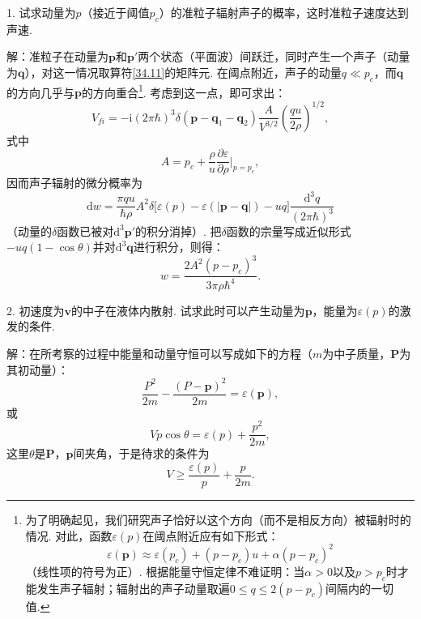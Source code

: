 \begin{xiti}

1. 试求动量为$p$（接近于阈值$p_{c}$）的准粒子辐射声子的概率，这时准粒子速度达到声速.

{\heiti 解：}准粒子在动量为$\bm{p}$和$\bm{p}'$两个状态（平面波）间跃迁，同时产生一个声子（动量为$\bm{q}$），对这一情况取算符\eqref{34.11}的矩阵元. 在阈点附近，声子的动量$q\ll p_{c}$，而$\bm{q}$的方向几乎与$\bm{p}$的方向重合\footnote{为了明确起见，我们研究声子恰好以这个方向（而不是相反方向）被辐射时的情况. 对此，函数$\varepsilon(p)$在阈点附近应有如下形式：
\begin{equation*}
\varepsilon(\bm{p})\approx\varepsilon(p_{c})+(p-p_{c})u+\alpha(p-p_{c})^{2}
\end{equation*}
（线性项的符号为正）. 根据能量守恒定律不难证明：当$\alpha>0$以及$p>p_{c}$时才能发生声子辐射；辐射出的声子动量取遍$0\leqslant q\leqslant 2(p-p_{c})$间隔内的一切值.}. 考虑到这一点，即可求出：
\begin{equation*}
V_{fi}=-\mathrm{i}(2\pi\hbar)^{3}\delta(\bm{p}-\bm{q}_{1}-\bm{q}_{2})
\frac{A}{V^{3/2}}\left(\frac{qu}{2\rho}\right)^{1/2},
\end{equation*}
式中
\begin{equation*}
A=p_{c}+\frac{\rho}{u}\frac{\partial\varepsilon}{\partial\rho}\bigg|_{p=p_{c}},
\end{equation*}
因而声子辐射的微分概率为
\begin{equation*}
\mathrm{d}w=\frac{\pi qu}{\hbar\rho}A^{2}
\delta\big[\varepsilon(p)-\varepsilon(|\bm{p}-\bm{q}|)-uq\big]
\frac{\mathrm{d}^{3}q}{(2\pi\hbar)^{3}}
\end{equation*}
（动量的$\delta$函数已被对$\mathrm{d}^{3}\bm{p}'$的积分消掉）. 把$\delta$函数的宗量写成近似形式$-uq(1-\cos\theta)$并对$\mathrm{d}^{3}\bm{q}$进行积分，则得：
\begin{equation*}
w=\frac{2A^{2}(p-p_{c})^{3}}{3\pi\rho\hbar^{4}}.
\end{equation*}

2. 初速度为$\bm{v}$的中子在液体内散射. 试求此时可以产生动量为$\bm{p}$，能量为$\varepsilon(p)$的激发的条件.

{\heiti 解：}在所考察的过程中能量和动量守恒可以写成如下的方程（$m$为中子质量，$\bm{P}$为其初动量）：
\begin{equation*}
\frac{P^{2}}{2m}-\frac{(P-\bm{p})^{2}}{2m}=\varepsilon(\bm{p}),
\end{equation*}
或
\begin{equation*}
Vp\cos\theta=\varepsilon(p)+\frac{p^{2}}{2m},
\end{equation*}
这里$\theta$是$\bm{P}$，$\bm{p}$间夹角，于是待求的条件为
\begin{equation*}
V\geqslant\frac{\varepsilon(p)}{p}+\frac{p}{2m}.
\end{equation*}

\end{xiti}


